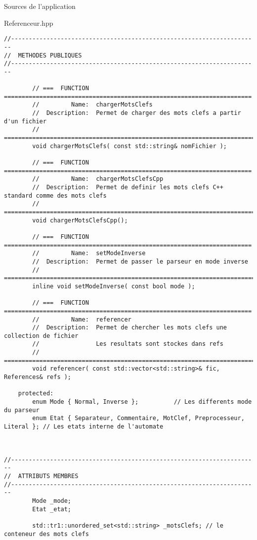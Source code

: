 \documentclass{article}
\begin{document}
\begin{section}{Sources de l'application}
\begin{paragraph}{Referenceur.hpp}
\begin{verbatim}
//----------------------------------------------------------------------
//  METHODES PUBLIQUES
//----------------------------------------------------------------------

        // ===  FUNCTION  ======================================================================
        //         Name:  chargerMotsClefs
        //  Description:  Permet de charger des mots clefs a partir d'un fichier
        // =====================================================================================
        void chargerMotsClefs( const std::string& nomFichier );
        
        // ===  FUNCTION  ======================================================================
        //         Name:  chargerMotsClefsCpp
        //  Description:  Permet de definir les mots clefs C++ standard comme des mots clefs
        // =====================================================================================
        void chargerMotsClefsCpp();
        
        // ===  FUNCTION  ======================================================================
        //         Name:  setModeInverse
        //  Description:  Permet de passer le parseur en mode inverse
        // =====================================================================================
        inline void setModeInverse( const bool mode );

        // ===  FUNCTION  ======================================================================
        //         Name:  referencer
        //  Description:  Permet de chercher les mots clefs une collection de fichier
        //                Les resultats sont stockes dans refs
        // =====================================================================================
        void referencer( const std::vector<std::string>& fic, References& refs );

    protected:
        enum Mode { Normal, Inverse };          // Les differents mode du parseur
        enum Etat { Separateur, Commentaire, MotClef, Preprocesseur, Literal }; // Les etats interne de l'automate



//----------------------------------------------------------------------
//  ATTRIBUTS MEMBRES
//----------------------------------------------------------------------
        Mode _mode;
        Etat _etat;

        std::tr1::unordered_set<std::string> _motsClefs; // le conteneur des mots clefs




\end{verbatim}
\end{paragraph}
\end{section}
\end{document}
